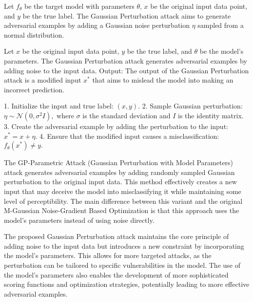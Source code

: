 Let \( f_{\theta} \) be the target model with parameters \( \theta \), \( x \) be the original input data point, and \( y \) be the true label. The Gaussian Perturbation attack aims to generate adversarial examples by adding a Gaussian noise perturbation \( \eta \) sampled from a normal distribution.


Let $x$ be the original input data point, $y$ be the true label, and $\theta$ be the model's parameters. The Gaussian Perturbation attack generates adversarial examples by adding noise to the input data.
Output: The output of the Gaussian Perturbation attack is a modified input $x^*$ that aims to mislead the model into making an incorrect prediction.

1. Initialize the input and true label:
   $
   (x, y).
   $
2. Sample Gaussian perturbation:
   $
   \eta \sim \mathcal{N}(0, \sigma^2 I),
   $
   where $\sigma$ is the standard deviation and $I$ is the identity matrix.
3. Create the adversarial example by adding the perturbation to the input:
   $
   x^* = x + \eta.
   $
4. Ensure that the modified input causes a misclassification:
   $
   f_{\theta}(x^*) \neq y.
   $

The GP-Parametric Attack (Gaussian Perturbation with Model Parameters) attack generates adversarial examples by adding randomly sampled Gaussian perturbation to the original input data. This method effectively creates a new input that may deceive the model into misclassifying it while maintaining some level of perceptibility. The main difference between this variant and the original M-Gaussian Noise-Gradient Based Optimization is that this approach uses the model's parameters instead of using noise directly.

The proposed Gaussian Perturbation attack maintains the core principle of adding noise to the input data but introduces a new constraint by incorporating the model's parameters. This allows for more targeted attacks, as the perturbation can be tailored to specific vulnerabilities in the model. The use of the model's parameters also enables the development of more sophisticated scoring functions and optimization strategies, potentially leading to more effective adversarial examples.